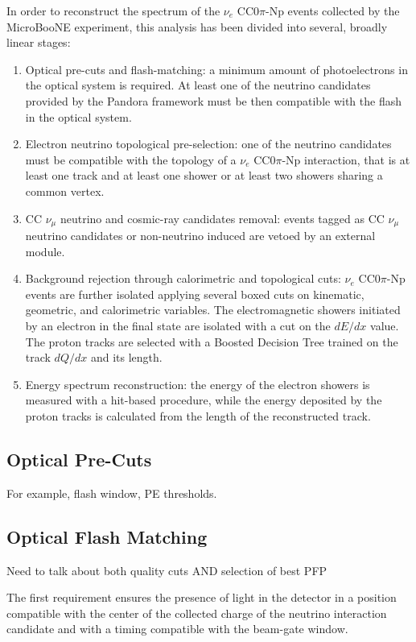 In order to reconstruct the spectrum of the $\nu_{e}$ CC0$\pi$-Np events collected by the MicroBooNE experiment, this analysis has been divided into several, broadly linear stages:
\begin{enumerate}
\item Optical pre-cuts and flash-matching: a minimum amount of photoelectrons in the optical system is required. At least one of the neutrino candidates provided by the Pandora framework must be then compatible with the flash in the optical system.
\item Electron neutrino topological pre-selection: one of the neutrino candidates must be compatible with the topology of a $\nu_{e}$ CC0$\pi$-Np interaction, that is at least one track and at least one shower or at least two showers sharing a common vertex.
\item CC $\nu_{\mu}$ neutrino and cosmic-ray candidates removal: events tagged as CC $\nu_{\mu}$ neutrino candidates or non-neutrino induced are vetoed by an external module.
\item Background rejection through calorimetric and topological cuts: $\nu_{e}$ CC0$\pi$-Np events are further isolated applying several boxed cuts on kinematic, geometric, and calorimetric variables. The electromagnetic showers initiated by an electron in the final state are isolated with a cut on the $dE/dx$ value. The proton tracks are selected with a Boosted Decision Tree trained on the track $dQ/dx$ and its length.
\item Energy spectrum reconstruction: the energy of the electron showers is measured with a hit-based procedure, while the energy deposited by the proton tracks is calculated from the length of the reconstructed track. 
\end{enumerate}

\subsection{Optical Pre-Cuts}
 For example, flash window, PE thresholds.

\subsection{Optical Flash Matching}
Need to talk about both quality cuts AND selection of best PFP 


The first requirement ensures the presence of light in the detector in a position compatible with the center of the collected charge of the neutrino interaction candidate and with a timing compatible with the beam-gate window.

